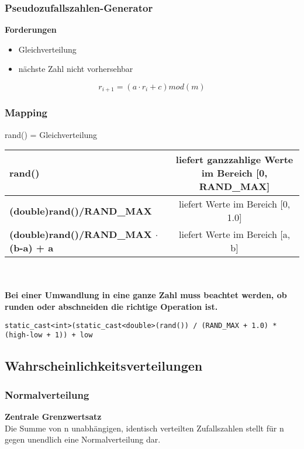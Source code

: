 \subsubsection{Pseudozufallszahlen-Generator}

\textbf{Forderungen}
\begin{itemize}
	\item Gleichverteilung
	\item nächste Zahl nicht vorhersehbar
\end{itemize}
\begin{equation}
	r_{i+1} = (a \cdot r_i + c)mod (m)
\end{equation}

\subsubsection{Mapping}
rand() = Gleichverteilung\\

\begin{tabular}{|l|c|}
	\hline
	\textbf{rand()}                              & liefert ganzzahlige Werte im Bereich [0, RAND\_MAX] \\ \hline
	\textbf{(double)rand()/RAND\_MAX}            &         liefert Werte im Bereich [0, 1.0]          \\ \hline
	\textbf{(double)rand()/RAND\_MAX $\cdot$(b-a) + a} &          liefert Werte im Bereich [a, b]           \\ \hline
\end{tabular} \\\\

\textbf{Bei einer Umwandlung in eine ganze Zahl muss beachtet werden, ob runden oder abschneiden die richtige Operation ist.}\\

\begin{lstlisting}
static_cast<int>(static_cast<double>(rand()) / (RAND_MAX + 1.0) * (high-low + 1)) + low
\end{lstlisting}


\subsection{Wahrscheinlichkeitsverteilungen}

\subsubsection{Normalverteilung}
\textbf{Zentrale Grenzwertsatz}\\
Die Summe von n unabhängigen, identisch verteilten Zufallszahlen stellt für n gegen unendlich eine Normalverteilung dar.

